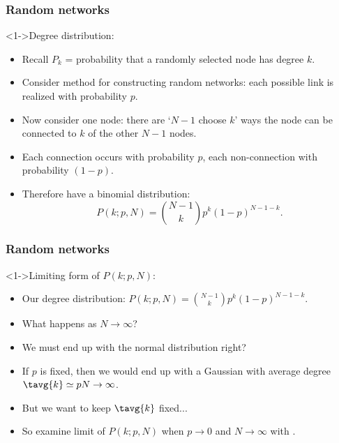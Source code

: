 \begin{frame}
  \frametitle{Random networks}
  
  \begin{block}<1->{Degree distribution:}
    \begin{itemize}
    \item<1-> 
      Recall $P_k$ = probability that a randomly
      selected node has degree $k$.
    \item<2-> 
      Consider method  for constructing
      random networks: each possible link is realized
      with probability $p$.
    \item<3-> 
      Now consider one node: there are `$N-1$ choose $k$'
      ways the node can be connected to $k$ of 
      the other $N-1$ nodes.
    \item<4->
      Each connection occurs with probability $p$,
      each non-connection with probability $(1-p)$.
    \item<5-> 
      Therefore have a binomial distribution:
      $$
      P(k;p,N) = \binom{N-1}{k} p^k (1-p)^{N-1-k}.
      $$
  \end{itemize}
  \end{block}
\end{frame}

\begin{frame}[label=]
  \frametitle{Random networks}

  \begin{block}<1->{Limiting form of $P(k;p,N)$:}
    \begin{itemize}
    \item<2->
      Our degree distribution:
      $
      P(k;p,N) = \binom{N-1}{k} p^k (1-p)^{N-1-k}.
      $
    \item<3->
      What happens as $N \rightarrow \infty$?
    \item<4->
      We must end up with the normal distribution right?
    \item<5->
      If $p$ is fixed, then we would end up
      with a Gaussian with average 
      degree $\tavg{k} \simeq pN \rightarrow \infty$.
    \item<6->
      But we want to keep $\tavg{k}$ fixed...
    \item<6->
      So examine limit of $P(k;p,N)$
      when \alert{$p \rightarrow 0$} and \alert{$N \rightarrow \infty$}
      with .
    \end{itemize}
  \end{block}

\end{frame}

